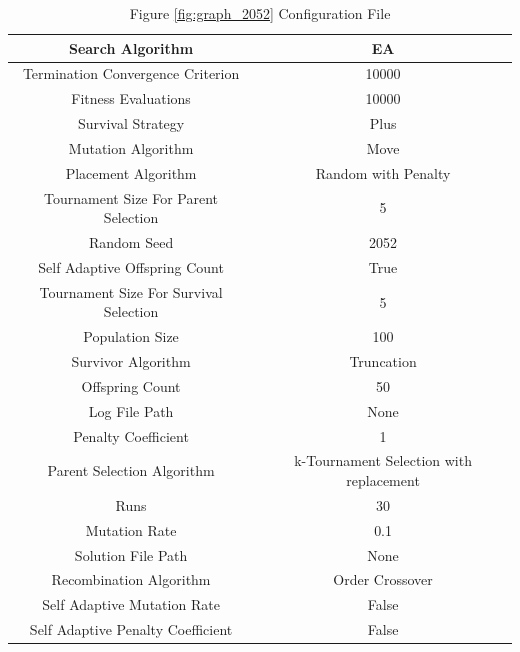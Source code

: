\documentclass{standalone}
\begin{document}
\begin{table}[!htb]
	\centering
	\caption{Figure \ref{fig:graph_2052} Configuration File}
	\label{tab:graph_2052}
	\begin{tabular}{| c | c |}
		\hline
		Search Algorithm		& EA		 \\
		\hline
		Termination Convergence Criterion		& 10000		 \\
		\hline
		Fitness Evaluations		& 10000		 \\
		\hline
		Survival Strategy		& Plus		 \\
		\hline
		Mutation Algorithm		& Move		 \\
		\hline
		Placement Algorithm		& Random with Penalty		 \\
		\hline
		Tournament Size For Parent Selection		& 5		 \\
		\hline
		Random Seed		& 2052		 \\
		\hline
		Self Adaptive Offspring Count		& True		 \\
		\hline
		Tournament Size For Survival Selection		& 5		 \\
		\hline
		Population Size		& 100		 \\
		\hline
		Survivor Algorithm		& Truncation		 \\
		\hline
		Offspring Count		& 50		 \\
		\hline
		Log File Path		& None		 \\
		\hline
		Penalty Coefficient		& 1		 \\
		\hline
		Parent Selection Algorithm		& k-Tournament Selection with replacement		 \\
		\hline
		Runs		& 30		 \\
		\hline
		Mutation Rate		& 0.1		 \\
		\hline
		Solution File Path		& None		 \\
		\hline
		Recombination Algorithm		& Order Crossover		 \\
		\hline
		Self Adaptive Mutation Rate		& False		 \\
		\hline
		Self Adaptive Penalty Coefficient		& False		 \\
		\hline
	\end{tabular}
\end{table}
\end{document}
